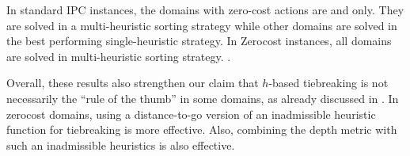 \begin{table}[htbp]
 \centering 
 \caption{
 Summary Results: Coverage comparison, the total of IPC domains and Zerocost domains (the number of instances
 solved in 5min, 4GB) between several sorting strategies, plus a dynamic configuration strategy.  $[f,h,\fifo],
 [f,h,\ro], [f,\hh,\cdot], [f,h, \hh,\cdot], [f,\ffo,\cdot]$ are not shown because they achieve smaller coverage.
 }
 \label{tbl:dtg-summary-sum}
\end{table}

In standard IPC instances, the domains with zero-cost actions are  and  only. They are solved in a multi-heuristic sorting strategy while other domains are solved in the best performing single-heuristic strategy. In Zerocost instances, all domains are solved in multi-heuristic sorting strategy.
.



Overall, these results also strengthen our claim that $h$-based
tiebreaking is not necessarily the ``rule of the thumb'' in some
domains, as already discussed in . In zerocost domains,
using a distance-to-go version of an inadmissible heuristic function for
tiebreaking is more effective. Also, combining the depth metric with
such an inadmissible heuristics is also effective.
